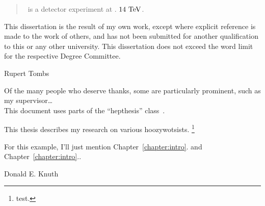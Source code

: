 

\begin{abstract}
\atlas\ is a detector experiment at \cern. $14~\eV[T]$.
\end{abstract}


\begin{declaration}
This dissertation is the result of my own work, except where explicit
reference is made to the work of others, and has not been submitted
for another qualification to this or any other university. This
dissertation does not exceed the word limit for the respective Degree
Committee.
\vspace*{1cm}
\begin{flushright}
Rupert Tombs
\end{flushright}
\end{declaration}


\begin{acknowledgements}
Of the many people who deserve thanks, some are particularly prominent,
such as my supervisor\dots
\\
This document uses parts of the ``hepthesis'' class~\cite{hepthesis}.
\end{acknowledgements}


\begin{preface}
This thesis describes my research on various hoozywotsists.%
\footnote{test.}

\noindent
For this example, I'll just mention Chapter~\ref{chapter:intro}.
and Chapter~\ref{chapter:intro}..
\end{preface}


\tableofcontents

%
{Donald E. Knuth~\cite{knuth1975art}}

\thispagestyle{empty}

